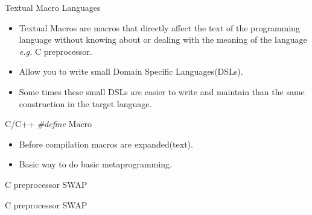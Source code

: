 \begin{frame}{Textual Macro Languages}
    \begin{itemize}
        \item Textual Macros are macros that directly affect the text of the 
            programming language without knowing about or dealing with the 
            meaning of the language \emph{e.g.} C preprocessor\cite{macrosibm}. 

        \vspace{5mm}

        \item Allow you to write small Domain Specific Languages(DSLs).

        \vspace{5mm}

        \item Some times these small DSLs are easier to write and maintain than
            the same construction in the target language.

    \end{itemize}
\end{frame}

\begin{frame}{C/C++ \emph{\#define} Macro}
    \begin{itemize}\addtolength{\itemsep}{1\baselineskip}
        \item Before compilation macros are expanded(text).

        \item Basic way to do basic metaprogramming.
    \end{itemize}
\end{frame}

\begin{frame}{C preprocessor SWAP}
    \begin{center}
    \end{center}
\end{frame}

\begin{frame}{C preprocessor SWAP}
    \begin{center}
    \end{center}
\end{frame}

